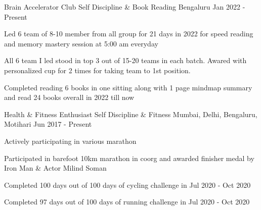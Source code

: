 \begin{cventries}
\cventry
    {Brain Accelerator Club} %
    {Self Discipline \& Book Reading} %
    {Bengaluru} %
    {Jan 2022 - Present} %
    {
      \begin{cvitems} %
        \item {Led 6 team of 8-10 member from all group for 21 days in 2022 for speed reading and memory mastery session at 5:00 am everyday }
        \item {All 6 team I led stood in top 3 out of 15-20 teams in each batch. Awared with personalized cup for 2 times for taking team to 1st position. }
        \item {Completed reading 6 books in one sitting along with 1 page mindmap summary and read 24 books overall in 2022 till now}
      \end{cvitems}
    }
\cventry
    {Health \& Fitness Enthusiast} %
    {Self Discipline \& Fitness} %
    {Mumbai, Delhi, Bengaluru, Motihari} %
    {Jun 2017 - Present} %
    {
      \begin{cvitems} %
        \item {Actively participating in various marathon}
        \item {Participated in barefoot 10km marathon in coorg and awarded finisher medal by Iron Man & Actor Milind Soman }
        \item {Completed 100 days out of 100 days of cycling challenge in Jul 2020 - Oct 2020}
        \item {Completed 97 days out of 100 days of running challenge in Jul 2020 - Oct 2020}
      \end{cvitems}
    }

\end{cventries}



